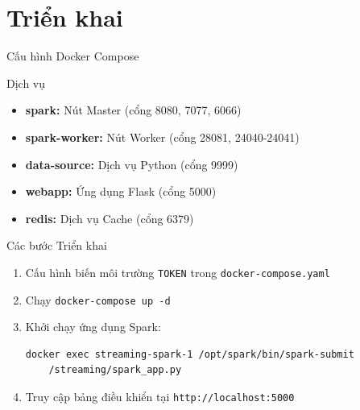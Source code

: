 \documentclass[aspectratio=169]{beamer}
\begin{document}
\section{Triển khai}

\begin{frame}{Cấu hình Docker Compose}
    \begin{block}{Dịch vụ}
        \begin{itemize}
            \item \textbf{spark:} Nút Master (cổng 8080, 7077, 6066)
            \item \textbf{spark-worker:} Nút Worker (cổng 28081, 24040-24041)
            \item \textbf{data-source:} Dịch vụ Python (cổng 9999)
            \item \textbf{webapp:} Ứng dụng Flask (cổng 5000)
            \item \textbf{redis:} Dịch vụ Cache (cổng 6379)
        \end{itemize}
    \end{block}
    
    \vspace{0.3cm}
    \begin{block}{Các bước Triển khai}
        \begin{enumerate}
            \item Cấu hình biến môi trường \texttt{TOKEN} trong \texttt{docker-compose.yaml}
            \item Chạy \texttt{docker-compose up -d}
            \item Khởi chạy ứng dụng Spark:
            \begin{lstlisting}[language=bash, basicstyle=\tiny]
docker exec streaming-spark-1 /opt/spark/bin/spark-submit 
    /streaming/spark_app.py
            \end{lstlisting}
            \item Truy cập bảng điều khiển tại \texttt{http://localhost:5000}
        \end{enumerate}
    \end{block}
\end{frame}
\end{document}

